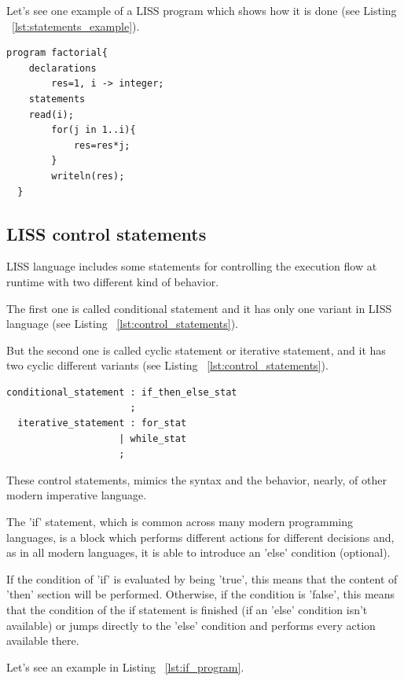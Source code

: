 \documentclass[
  oneside,
  11pt, a4paper,
  footinclude=true,
  headinclude=true,
  cleardoublepage=empty
]{scrbook}
\begin{document}
Let's see one example of a LISS program which shows how it is done (see Listing ~\ref{lst:statements_example}).

\begin{lstlisting}[caption={Example of using statements in LISS},label={lst:statements_example}]
  program factorial{
    declarations
        res=1, i -> integer;
    statements
	read(i);
        for(j in 1..i){
            res=res*j;
        }
        writeln(res);
  }
\end{lstlisting}




\subsection{LISS control statements}

LISS language includes some statements for controlling the execution flow at runtime with two different kind of behavior.

The first one is called conditional statement and it has only one variant in LISS language (see Listing ~\ref{lst:control_statements}).

But the second one is called cyclic statement or iterative statement, and it has two cyclic different variants (see Listing ~\ref{lst:control_statements}).

\begin{lstlisting}[caption={BNF of control statements in LISS},label={lst:control_statements}]
  conditional_statement : if_then_else_stat
                      ;
  iterative_statement : for_stat
                    | while_stat
                    ;
\end{lstlisting}

These control statements, mimics the syntax and the behavior, nearly,  of other modern imperative language.

The 'if' statement, which is common across many modern programming languages, is a block which performs different actions for different decisions and, as in all modern languages, it is able to introduce an 'else' condition (optional).

If the condition of 'if' is evaluated by being 'true', this means that the content of 'then' section will be performed. Otherwise, if the condition is 'false', this means that the condition of the if statement is finished (if an 'else' condition isn't available) or jumps directly to the 'else' condition and performs every action available there.

Let's see an example in Listing ~\ref{lst:if_program}.
\end{document}
